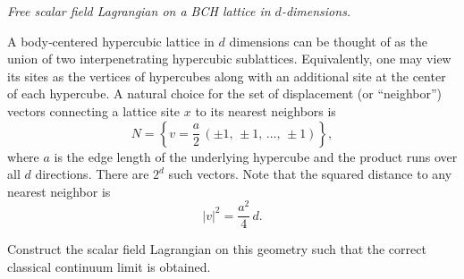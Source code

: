 \problem
{{\textit{Free scalar field Lagrangian on a BCH lattice in $d$-dimensions.}}

A body‐centered hypercubic lattice in \(d\) dimensions can be thought of as the union of two interpenetrating hypercubic sublattices. Equivalently, one may view its sites as the vertices of hypercubes along with an additional site at the center of each hypercube. A natural choice for the set of displacement (or “neighbor”) vectors connecting a lattice site \(x\) to its nearest neighbors is
\[
N=\left\{v = \frac{a}{2}\,(\pm 1,\, \pm 1,\, \dots,\, \pm 1)\right\},
\]
where \(a\) is the edge length of the underlying hypercube and the product runs over all \(d\) directions. There are \(2^d\) such vectors. Note that the squared distance to any nearest neighbor is
\[
|v|^2 = \frac{a^2}{4}\,d.
\]

Construct the scalar field Lagrangian on this geometry such that the correct classical continuum limit is obtained.
}
